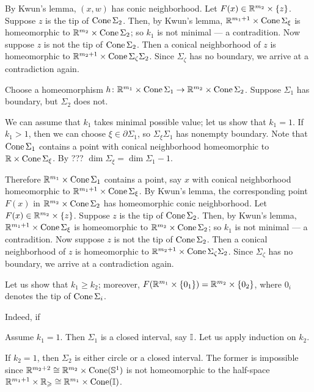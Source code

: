 By Kwun's lemma, $(x,w)$ has conic neighborhood.
Let $F(x) \in \mathbb{R}^{m_2}\times \{z\}$.
Suppose $z$ is the tip of $\mathop{\rm Cone}\nolimits \Sigma_2$.
Then, by Kwun's lemma, $\mathbb{R}^{m_1+1}\times \mathop{\rm Cone}\nolimits\Sigma_\xi$ is homeomorphic to $\mathbb{R}^{m_2}\times \mathop{\rm Cone}\nolimits \Sigma_2$;
so $k_1$ is not minimal --- a contradition.
Now suppose $z$ is not the tip of $\mathop{\rm Cone}\nolimits \Sigma_2$.
Then a conical neighborhood of $z$ is homeomorphic to $\mathbb{R}^{m_2+1}\times \mathop{\rm Cone}\nolimits\Sigma_\zeta\Sigma_2$.
Since $\Sigma_\zeta$ has no boundary, we arrive at a contradiction again.



Choose a homeomorphism $h\colon\mathbb{R}^{m_1}\times \mathop{\rm Cone}\nolimits \Sigma_1\to \mathbb{R}^{m_2}\times \mathop{\rm Cone}\nolimits \Sigma_2$.
Suppose $\Sigma_1$ has boundary, but $\Sigma_2$ does not.

We can assume that $k_1$ takes minimal possible value; let us show that $k_1=1$.
If $k_1>1$, then we can choose $\xi\in \partial \Sigma_1$, so $\Sigma_\xi\Sigma_1$ has nonempty boundary.
Note that $\mathop{\rm Cone}\nolimits \Sigma_1$ contains a point with conical neighborhood homeomorphic to $\mathbb{R}\times \mathop{\rm Cone}\nolimits\Sigma_\xi$.
By ??? $\dim\Sigma_\xi=\dim\Sigma_1-1$.

Therefore $\mathbb{R}^{m_1}\times \mathop{\rm Cone}\nolimits \Sigma_1$ contains a point, say $x$ with conical neighborhood homeomorphic to $\mathbb{R}^{m_1+1}\times \mathop{\rm Cone}\nolimits\Sigma_\xi$.
By Kwun's lemma, the corresponding point $F(x)$ in $\mathbb{R}^{m_2}\times \mathop{\rm Cone}\nolimits \Sigma_2$ has homeomorphic conic neighborhood.
Let $F(x) \in \mathbb{R}^{m_2}\times \{z\}$.
Suppose $z$ is the tip of $\mathop{\rm Cone}\nolimits \Sigma_2$.
Then, by Kwun's lemma, $\mathbb{R}^{m_1+1}\times \mathop{\rm Cone}\nolimits\Sigma_\xi$ is homeomorphic to $\mathbb{R}^{m_2}\times \mathop{\rm Cone}\nolimits \Sigma_2$;
so $k_1$ is not minimal --- a contradition.
Now suppose $z$ is not the tip of $\mathop{\rm Cone}\nolimits \Sigma_2$.
Then a conical neighborhood of $z$ is homeomorphic to $\mathbb{R}^{m_2+1}\times \mathop{\rm Cone}\nolimits\Sigma_\zeta\Sigma_2$.
Since $\Sigma_\zeta$ has no boundary, we arrive at a contradiction again.


Let us show that  $k_1\ge k_2$;
moreover, $F(\mathbb{R}^{m_1}\times \{0_1\})=\mathbb{R}^{m_2}\times \{0_2\}$, where $0_i$ denotes the tip of $\mathop{\rm Cone}\nolimits \Sigma_i$.

Indeed, if 

Assume $k_1 = 1$.
Then $\Sigma_1$ is a closed interval, say $\mathbb{I}$.
Let us apply induction on $k_2$.

If $k_2=1$, then $\Sigma_2$ is either circle or a closed interval.
The former is impossible since $\mathbb{R}^{m_2+2}\cong\mathbb{R}^{m_2}\times \mathop{\rm Cone}\nolimits(\mathbb{S}^1)$ is not homeomorphic to the half-space $\mathbb{R}^{m_1+1}\times \mathbb{R}_\geqslant\cong\mathbb{R}^{m_1}\times \mathop{\rm Cone}\nolimits(\mathbb{I})$.

